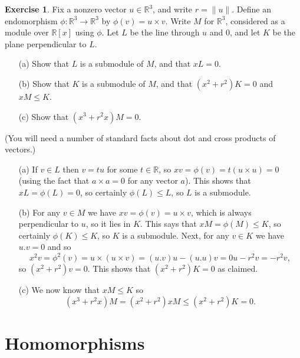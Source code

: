 \documentclass{amsart}
\newcommand{\R}         {{\mathbb{R}}}
\newcommand{\tm}        {\times}
\newcommand{\xra}       {\xrightarrow}
\newcommand{\ip}[1]     {\langle #1\rangle}
\renewcommand{\:}{\colon}
\theoremstyle{definition}
\newtheorem{exercise}{Exercise}[section]
\renewenvironment{solution}{\SolutionAtEnd}{\endSolutionAtEnd}
\begin{document}
\begin{exercise}
 Fix a nonzero vector $u\in\R^3$, and write $r=\|u\|$.  Define an
 endomorphism $\phi\:\R^3\xra{}\R^3$ by $\phi(v)=u\tm v$.  Write $M$
 for $\R^3$, considered as a module over $\R[x]$ using $\phi$.  Let
 $L$ be the line through $u$ and $0$, and let $K$ be the plane
 perpendicular to $L$.
 \begin{itemize}
  \item[(a)] Show that $L$ is a submodule of $M$, and that $xL=0$.
  \item[(b)] Show that $K$ is a submodule of $M$, and that $(x^2+r^2)K=0$
   and $xM\leq K$.
  \item[(c)] Show that $(x^3 + r^2 x)M=0$.
 \end{itemize}
 (You will need a number of standard facts about dot and cross
 products of vectors.)
\end{exercise}
\begin{solution}
 \begin{itemize}
 \item[(a)] If $v\in L$ then $v=tu$ for some $t\in\R$, so
  $xv=\phi(v)=t(u\tm u)=0$ (using the fact that $a\tm a=0$ for any
  vector $a$).  This shows that $xL=\phi(L)=0$, so certainly
  $\phi(L)\leq L$, so $L$ is a submodule.
 \item[(b)] For any $v\in M$ we have $xv=\phi(v)=u\tm v$, which is
  always perpendicular to $u$, so it lies in $K$.  This says that
  $xM=\phi(M)\leq K$, so certainly $\phi(K)\leq K$, so $K$ is a
  submodule.  Next, for any $v\in K$ we have $u.v=0$ and so 
  \[ x^2v = \phi^2(v) = u\tm(u\tm v) = (u.v)u - (u.u)v =
      0u - r^2v = -r^2 v,
  \]
  so $(x^2 + r^2)v=0$.  This shows that $(x^2+r^2)K=0$ as claimed.
 \item[(c)] We now know that $xM\leq K$ so 
  \[ (x^3+r^2x)M = (x^2+r^2)xM \leq (x^2 + r^2) K = 0. \]
 \end{itemize}
\end{solution}


\section{Homomorphisms}
\label{sec-homomorphisms}
\end{document}
